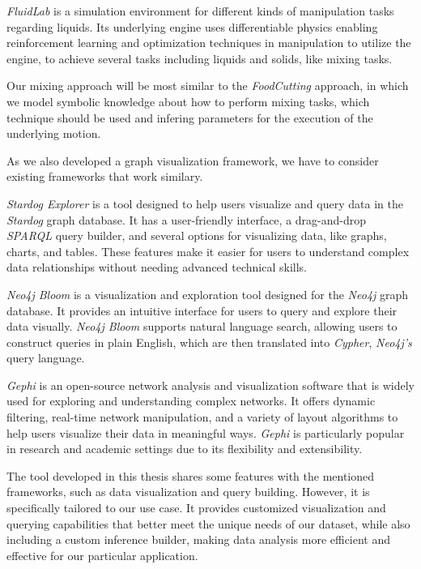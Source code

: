 \textit{FluidLab} \cite{xian2023fluidlab} is a simulation environment for different kinds of manipulation tasks regarding liquids. Its underlying engine uses differentiable physics 
enabling reinforcement learning and optimization techniques in manipulation to utilize the engine, to achieve several tasks 
including liquids and solids, like mixing tasks. 

Our mixing approach will be most similar to the \textit{FoodCutting} approach, in which we model symbolic knowledge about how to perform
mixing tasks, which technique should be used and infering parameters for the execution of the underlying motion.

As we also developed a graph visualization framework, we have to consider existing frameworks that work similary.

\textit{Stardog Explorer} \cite{StardogExplorer} is a tool designed to help users visualize and query data in the \textit{Stardog} graph database. It has a user-friendly interface, a drag-and-drop \textit{SPARQL} query builder, and several options for visualizing data, like graphs, charts, and tables. These features make it easier for users to understand complex data relationships without needing advanced technical skills.

\textit{Neo4j Bloom} \cite{neo4j} is a visualization and exploration tool designed for the \textit{Neo4j} graph database. It provides an intuitive interface for users to query and explore their data visually. \textit{Neo4j Bloom} \cite{neo4j} supports natural language search, allowing users to construct queries in plain English, which are then translated into \textit{Cypher}, \textit{Neo4j's} query language.

\textit{Gephi} \cite{gephi} is an open-source network analysis and visualization software that is widely used for exploring and understanding complex networks. It offers dynamic filtering, real-time network manipulation, and a variety of layout algorithms to help users visualize their data in meaningful ways. \textit{Gephi} \cite{gephi} is particularly popular in research and academic settings due to its flexibility and extensibility.

The tool developed in this thesis shares some features with the mentioned frameworks, such as data visualization and query building. However, it is specifically tailored to our use case. It provides customized visualization and querying capabilities that better meet the unique needs of our dataset, while also including a custom inference builder, making data analysis more efficient and effective for our particular application.